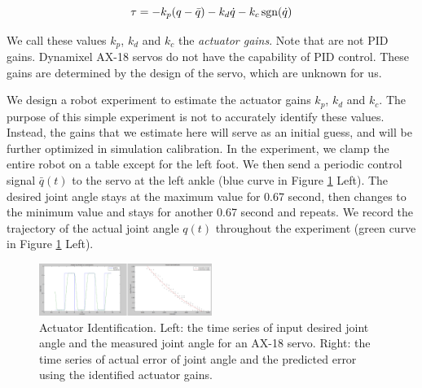 \begin{equation}
  \tau = -k_p(q-\bar{q}) - k_d\dot{q} - k_c\operatorname{sgn}(\dot{q})\\
    \label{eqn:torqueErrorRelationSimple}
\end{equation}

We call these values $k_p$, $k_d$ and $k_c$ the \emph{actuator gains}. Note that are not PID gains. Dynamixel AX-18 servos do not have the capability of PID control. These gains are determined by the design of the servo, which are unknown for us.

We design a robot experiment to estimate the actuator gains $k_p$, $k_d$ and $k_c$. The purpose of this simple experiment is not to accurately identify these values. Instead, the gains that we estimate here will serve as an initial guess, and will be further optimized in simulation calibration. In the experiment, we clamp the entire robot on a table except for the left foot. We then send a periodic control signal $\bar{q}(t)$ to the servo at the left ankle (blue curve in Figure \ref{fig:actuatorId} Left). The desired joint angle stays at the maximum value for 0.67 second, then changes to the minimum value and stays for another 0.67 second and repeats. We record the trajectory of the actual joint angle $q(t)$ throughout the experiment (green curve in Figure \ref{fig:actuatorId} Left). 

\begin{figure}[!t]
  \centering
  \includegraphics[width=0.5\textwidth]{figures/actuatorId}
  \caption{Actuator Identification. Left: the time series of input desired joint angle and the measured joint angle for an AX-18 servo. Right: the time series of actual error of joint angle and the predicted error using the identified actuator gains.  }
  \label{fig:actuatorId}
\end{figure}

